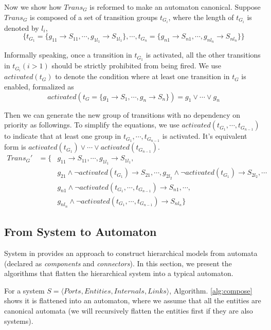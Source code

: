 Now we show how $Trans_G$ is reformed to make an automaton canonical.
Suppose $Trans_G$ is composed of a set of transition groups $t_{G_i}$, where the length of $t_{G_i}$ is denoted by $l_i$,
\[
    \{t_{G_1}=\{g_{11}\rightarrow S_{11},\cdots, g_{1l_1}\rightarrow S_{1l_1}\},\cdots,t_{G_n}=\{g_{n1}\rightarrow S_{n1},\cdots,g_{nl_n}\rightarrow S_{nl_n}\}\}
\]

Informally speaking, once a transition in $t_{G_1}$ is activated, all the other transitions in $t_{G_i}(i>1)$ should be strictly prohibited from being fired. We use $activated(t_G)$ to denote the condition where at least one transition in $t_G$ is enabled, formalized as
\[
    activated(t_G=\{g_1\rightarrow S_1,\cdots, g_n\rightarrow S_n\}) = g_1\lor\cdots\lor g_n
\]

Then we can generate the new group of transitions with no dependency on priority as followings. To simplify the equations, we use $activated(t_{G_1},\cdots,t_{G_{n-1}})$ to indicate that at least one group in $t_{G_1},\cdots,t_{G_{n-1}}$ is activated. It's equivalent form is $activated(t_{G_1})\lor\cdots\lor activated(t_{G_{n-1}})$.
\begin{eqnarray*}
    Trans_G' & = \{ & g_{11}\rightarrow S_{11}, \cdots ,g_{1l_1}\rightarrow S_{1l_1}, \\
    & & g_{21}\land \lnot activated(t_{G_1})\rightarrow S_{21}, \cdots, g_{2l_2} \land \lnot activated(t_{G_1})\rightarrow S_{2l_2}, \cdots \\
    & & g_{n1}\land \lnot activated(t_{G_1},\cdots,t_{G_{n-1}})\rightarrow S_{n1}, \cdots, \\
    & & g_{nl_n} \land \lnot activated(t_{G_1},\cdots, t_{G_{n-1}})\rightarrow S_{nl_n}\}
\end{eqnarray*}


\subsection{From System to Automaton}
\label{subsec:composition}

System in \lang{} provides an approach to construct hierarchical models from automata (declared as \emph{components} and \emph{connectors}). In this section, we present the algorithms that flatten the hierarchical system into a typical automaton.

For a system $S=\langle Ports, Entities, Internals, Links\rangle$, Algorithm. \ref{alg:compose} shows it is flattened into an automaton, where we assume that all the entities are canonical automata (we will recursively flatten the entities first if they are also systems).

